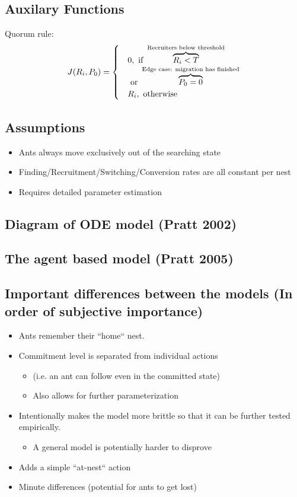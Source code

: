 \documentclass[letterpaper]{article}
\makeatletter
\def\mcolor#1#{\@mcolor{#1}}
\def\@mcolor#1#2#3{%
  \protect\leavevmode
  \begingroup
    \color#1{#2}#3%
  \endgroup
}
\newcommand{\annotate}[3]{
\mcolor{#1}{\overbrace{#3}^\text{#2}}
}
\newcommand{\sitem}[1]
{
    \begin{itemize}
        \item #1
    \end{itemize}
}
\makeatother
\begin{document}
  \subsection{Auxilary Functions}
      \Large
      Quorum rule:
      \begin{equation}
          J(R_i, P_0) = 
          \begin{cases}
              & 0,  \text{ if } \annotate{black}{Recruiters below threshold}{R_i < T} \\  
              &     \text{     or } \annotate{black}{Edge case: migration has finished}{P_0 = 0}\\
              & R_i, \text{ otherwise}
          \end{cases}
      \end{equation}

  \subsection{Assumptions}
      \begin{itemize}
          \item Ants always move exclusively out of the searching state
          \item Finding/Recruitment/Switching/Conversion rates are all constant per nest
          \item Requires detailed parameter estimation
      \end{itemize}

  \subsection{Diagram of ODE model (Pratt 2002)}

  \subsection{The agent based model (Pratt 2005)}

  \subsection{Important differences between the models (In order of subjective importance)}
      \begin{itemize}
          \item Ants remember their ``home`` nest.
          \item Commitment level is separated from individual actions 
              \sitem{(i.e. an ant can follow even in the committed state)}
              \sitem{Also allows for further parameterization}
          \item Intentionally makes the model more brittle so that it can be further tested empirically. 
              \sitem{A general model is potentially harder to disprove}
          \item Adds a simple ``at-nest`` action 
          \item Minute differences (potential for ants to get lost)
      \end{itemize}
\end{document}
